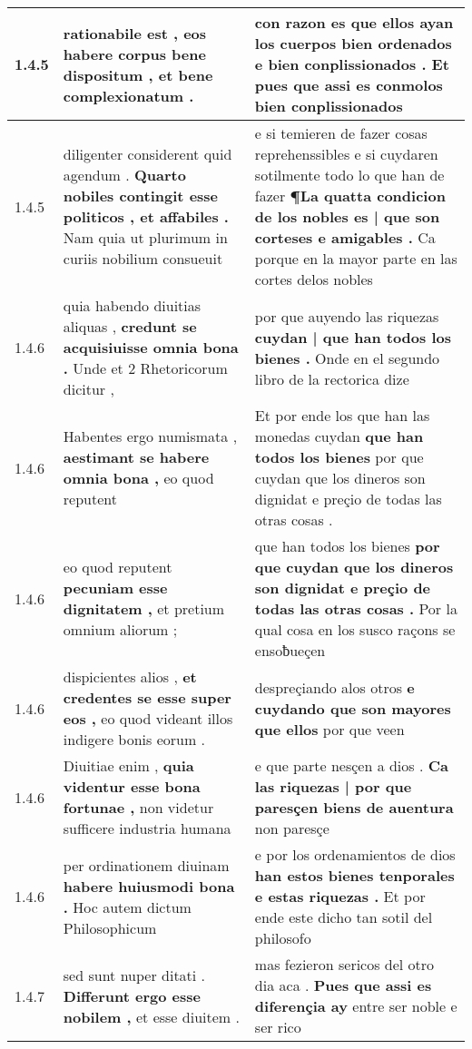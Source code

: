 \begin{tabular}{|p{1cm}|p{6.5cm}|p{6.5cm}|}
1.4.5 & rationabile est , \textbf{ eos habere corpus bene dispositum , } et bene complexionatum . & con razon es \textbf{ que ellos ayan los cuerpos bien ordenados e bien conplissionados . } Et pues que assi es conmolos bien conplissionados \\\hline
1.4.5 & diligenter considerent quid agendum . \textbf{ Quarto nobiles contingit esse politicos , et affabiles . } Nam quia ut plurimum in curiis nobilium consueuit & e si temieren de fazer cosas reprehenssibles e si cuydaren sotilmente todo lo que han de fazer \textbf{ ¶La quatta condicion de los nobles es | que son corteses e amigables . } Ca porque en la mayor parte en las cortes delos nobles \\\hline
1.4.6 & quia habendo diuitias aliquas , \textbf{ credunt se acquisiuisse omnia bona . } Unde et 2 Rhetoricorum dicitur , & por que auyendo las riquezas \textbf{ cuydan | que han todos los bienes . } Onde en el segundo libro de la rectorica dize \\\hline
1.4.6 & Habentes ergo numismata , \textbf{ aestimant se habere omnia bona , } eo quod reputent & Et por ende los que han las monedas cuydan \textbf{ que han todos los bienes } por que cuydan que los dineros son dignidat e preçio de todas las otras cosas . \\\hline
1.4.6 & eo quod reputent \textbf{ pecuniam esse dignitatem , } et pretium omnium aliorum ; & que han todos los bienes \textbf{ por que cuydan que los dineros son dignidat e preçio de todas las otras cosas . } Por la qual cosa en los susco raçons se ensoƀueçen \\\hline
1.4.6 & dispicientes alios , \textbf{ et credentes se esse super eos , } eo quod videant illos indigere bonis eorum . & despreçiando alos otros \textbf{ e cuydando que son mayores que ellos } por que veen \\\hline
1.4.6 & Diuitiae enim , \textbf{ quia videntur esse bona fortunae , } non videtur sufficere industria humana & e que parte nesçen a dios . \textbf{ Ca las riquezas | por que paresçen biens de auentura } non paresçe \\\hline
1.4.6 & per ordinationem diuinam \textbf{ habere huiusmodi bona . } Hoc autem dictum Philosophicum & e por los ordenamientos de dios \textbf{ han estos bienes tenporales e estas riquezas . } Et por ende este dicho tan sotil del philosofo \\\hline
1.4.7 & sed sunt nuper ditati . \textbf{ Differunt ergo esse nobilem , } et esse diuitem . & mas fezieron sericos del otro dia aca . \textbf{ Pues que assi es diferençia ay } entre ser noble e ser rico \\\hline

\end{tabular}
